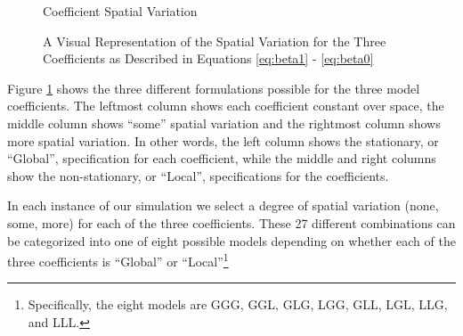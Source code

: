 \documentclass{article}\usepackage[]{graphicx}\usepackage[]{color}
\begin{document}
\begin{figure}
\caption*{Coefficient Spatial Variation}
\caption{A Visual Representation of the Spatial Variation for the Three Coefficients as Described in Equations \eqref{eq:beta1} - \eqref{eq:beta0}}
\label{fig:spvarBeta}
\end{figure}

Figure \ref{fig:spvarBeta} shows the three different formulations possible for the three model coefficients. The leftmost column shows each coefficient constant over space, the middle column shows ``some'' spatial variation and the rightmost column shows more spatial variation. In other words, the left column shows the stationary, or ``Global'', specification for each coefficient, while the middle and right columns show the non-stationary, or ``Local'', specifications for the coefficients. 

In each instance of our simulation we select a degree of spatial variation (none, some, more) for each of the three coefficients. These 27 different combinations can be categorized into one of eight possible models depending on whether each of the three coefficients is ``Global'' or ``Local''\footnote{Specifically, the eight models are GGG, GGL, GLG, LGG, GLL, LGL, LLG, and LLL.}
\end{document}
